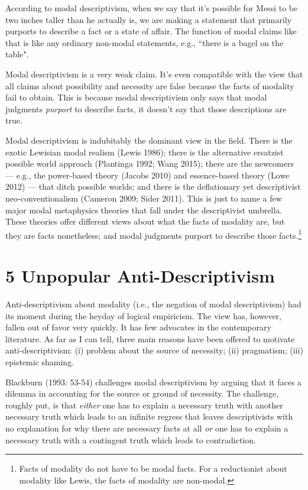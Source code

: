 \documentclass[a4paper,12pt]{article}
\begin{document}
According to modal descriptivism, when we say that it's possible for Messi to be two inches taller than he actually is, we are making a statement that primarily purports to describe a fact or a state of affair. The function of modal claims like that is like any ordinary non-modal statements, e.g., ``there is a bagel on the table".

Modal descriptivism is a very weak claim. It's even compatible with the view that all claims about possibility and necessity are false because the facts of modality fail to obtain. This is because modal descriptivism only says that modal judgments \emph{purport} to describe facts, it doesn't say that those descriptions are true.

Modal descriptivism is indubitably the dominant view in the field. There is the exotic Lewisian modal realism (Lewis 1986); there is the alternative ersatzist possible world approach (Plantinga 1992; Wang 2015); there are the newcomers --- e.g., the power-based theory (Jacobs 2010) and essence-based theory (Lowe 2012) --- that ditch possible worlds; and there is the deflationary yet descriptivist neo-conventionalism (Cameron 2009; Sider 2011). This is just to name a few major modal metaphysics theories that fall under the descriptivist umbrella. These theories offer different views about what the facts of modality are, but they are facts nonetheless; and modal judgments purport to describe those facts.\footnote{Facts of modality do not have to be modal facts. For a reductionist about modality like Lewis, the facts of modality are non-modal.}

\section*{5 Unpopular Anti-Descriptivism}

Anti-descriptivism about modality (i.e., the negation of modal descriptivism) had its moment during the heyday of logical empiricism. The view has, however, fallen out of favor very quickly. It has few advocates in the contemporary literature. As far as I can tell, three main reasons have been offered to motivate anti-descriptivism: (i) problem about the source of necessity; (ii) pragmatism; (iii) epistemic shaming.

Blackburn (1993: 53-54) challenges modal descriptivism by arguing that it faces a dilemma in accounting for the source or ground of necessity. The challenge, roughly put, is that \emph{either} one has to explain a necessary truth with another necessary truth which leads to an infinite regress that leaves descriptivists with no explanation for why there are necessary facts at all \emph{or} one has to explain a necessary truth with a contingent truth which leads to contradiction.
\end{document}

